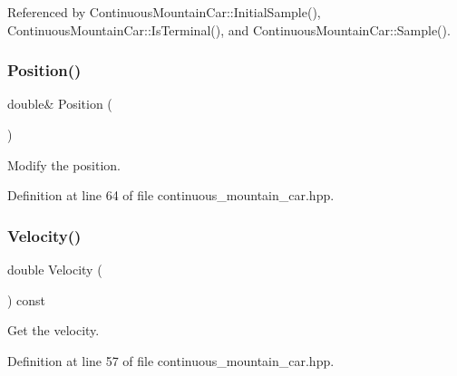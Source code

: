 Referenced by Continuous\+Mountain\+Car\+::\+Initial\+Sample(), Continuous\+Mountain\+Car\+::\+Is\+Terminal(), and Continuous\+Mountain\+Car\+::\+Sample().

\mbox{\label{classmlpack_1_1rl_1_1ContinuousMountainCar_1_1State_a005c39713bc5c65715a94572bfb5fc29}} 
\subsubsection{Position()\hspace{0.1cm}{\footnotesize\ttfamily [2/2]}}
{\footnotesize\ttfamily double\& Position (\begin{DoxyParamCaption}{ }\end{DoxyParamCaption})\hspace{0.3cm}{\ttfamily [inline]}}



Modify the position. 



Definition at line 64 of file continuous\+\_\+mountain\+\_\+car.\+hpp.

\mbox{\label{classmlpack_1_1rl_1_1ContinuousMountainCar_1_1State_a5281cef88d4e272d6cb8581bff91195a}} 
\subsubsection{Velocity()\hspace{0.1cm}{\footnotesize\ttfamily [1/2]}}
{\footnotesize\ttfamily double Velocity (\begin{DoxyParamCaption}{ }\end{DoxyParamCaption}) const\hspace{0.3cm}{\ttfamily [inline]}}



Get the velocity. 



Definition at line 57 of file continuous\+\_\+mountain\+\_\+car.\+hpp.



